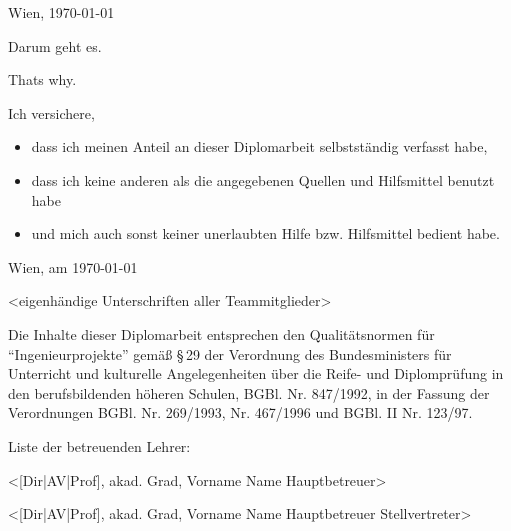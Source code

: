 \documentclass[12pt,a4paper,english,twoside,openright,DIV=12,BCOR=1cm]{scrbook}
\begin{document}
\begin{titlepage}
\begin{center}
\vspace{5mm}
Wien, \today
\par\end{center}

\end{titlepage}%



\thispagestyle{fancy}

Darum geht es.


\thispagestyle{fancy}

Thats why.


\thispagestyle{fancy}

Ich versichere,
\begin{itemize}
\item dass ich meinen Anteil an dieser Diplomarbeit selbstständig verfasst
habe,
\item dass ich keine anderen als die angegebenen Quellen und Hilfsmittel
benutzt habe
\item und mich auch sonst keiner unerlaubten Hilfe bzw. Hilfsmittel bedient
habe.
\end{itemize}
\bigskip{}
Wien, am \today

<eigenhändige Unterschriften aller Teammitglieder>



\thispagestyle{fancy}

Die Inhalte dieser Diplomarbeit entsprechen den Qualitätsnormen für
``Ingenieurprojekte'' gemäß §\,29 der Verordnung des Bundesministers
für Unterricht und kulturelle Angelegenheiten über die Reife- und
Diplomprüfung in den berufsbildenden höheren Schulen, BGBl. Nr. 847/1992,
in der Fassung der Verordnungen BGBl. Nr. 269/1993, Nr. 467/1996 und
BGBl. II Nr. 123/97.

\vspace{10mm}


Liste der betreuenden Lehrer:

<{[}Dir|AV|Prof{]}, akad. Grad, Vorname Name Hauptbetreuer>

<{[}Dir|AV|Prof{]}, akad. Grad, Vorname Name Hauptbetreuer Stellvertreter>
\end{document}
